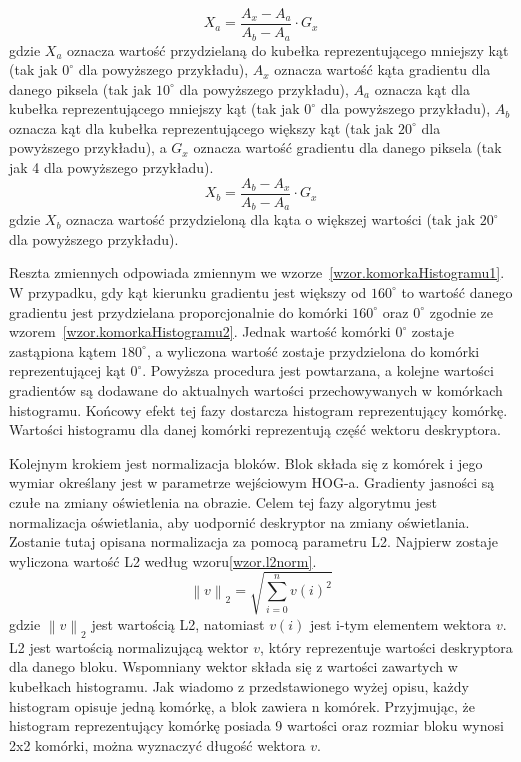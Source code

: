 \documentclass[a4paper,twoside,12pt]{book}
\begin{document}
    \large
    \begin{equation}
        X_{a} = \frac{A_{x}-A_{a}}{A_{b}-A_{a}} \cdot G_{x}
        \label{wzor.komorkaHistogramu1}
    \end{equation}
    \normalsize
    gdzie $X_{a}$ oznacza wartość przydzielaną do kubełka reprezentującego mniejszy kąt (tak jak $0^{\circ}$
    dla powyższego przykładu), $A_{x}$ oznacza wartość kąta gradientu dla danego piksela (tak jak $10^{\circ}$
    dla powyższego przykładu), $A_{a}$ oznacza kąt dla kubełka reprezentującego mniejszy kąt (tak jak $0^{\circ}$
    dla powyższego przykładu), $A_{b}$ oznacza kąt dla kubełka reprezentującego większy kąt (tak jak $20^{\circ}$
    dla powyższego przykładu), a $G_{x}$ oznacza wartość gradientu dla danego piksela (tak jak 4 dla powyższego
    przykładu).
    \large
    \begin{equation}
        X_{b} = \frac{A_{b}-A_{x}}{A_{b}-A_{a}} \cdot G_{x}
        \label{wzor.komorkaHistogramu2}
    \end{equation}
    \normalsize
    gdzie $X_{b}$ oznacza wartość przydzieloną dla kąta o większej wartości (tak jak $20^{\circ}$
    dla powyższego przykładu).

    Reszta zmiennych odpowiada zmiennym we wzorze~\ref{wzor.komorkaHistogramu1}.
    W przypadku, gdy kąt kierunku gradientu jest większy od $160^{\circ}$ to wartość danego gradientu jest
    przydzielana proporcjonalnie do komórki $160^{\circ}$ oraz $0^{\circ}$ zgodnie ze
    wzorem~\ref{wzor.komorkaHistogramu2}. Jednak wartość komórki $0^{\circ}$ zostaje zastąpiona kątem $180^{\circ}$,
    a wyliczona wartość zostaje przydzielona do komórki reprezentującej kąt $0^{\circ}$.
    Powyższa procedura jest powtarzana, a kolejne wartości gradientów są dodawane do aktualnych wartości przechowywanych
    w komórkach histogramu. Końcowy efekt tej fazy dostarcza histogram reprezentujący komórkę. Wartości histogramu
    dla danej komórki reprezentują część wektoru deskryptora.

    Kolejnym krokiem jest normalizacja bloków. Blok składa się z komórek i jego wymiar określany jest w parametrze
    wejściowym HOG-a.
    Gradienty jasności są czułe na zmiany oświetlenia na obrazie. Celem tej fazy algorytmu jest normalizacja oświetlania,
    aby uodpornić deskryptor na zmiany oświetlania.
    Zostanie tutaj opisana normalizacja za pomocą parametru L2.
    Najpierw zostaje wyliczona wartość L2 według wzoru\ref{wzor.l2norm}.
    \large
    \begin{equation}
        \left \|v  \right \|_{2}=\sqrt{\sum_{i=0}^{n}v(i)^{2}}
        \label{wzor.l2norm}
    \end{equation}
    \normalsize
    gdzie $\left \|v  \right \|_{2}$ jest wartością L2, natomiast $v(i)$ jest i-tym elementem wektora $v$.
    L2 jest wartością normalizującą wektor $v$, który reprezentuje
    wartości
    deskryptora dla danego bloku. Wspomniany wektor składa się z wartości zawartych w kubełkach histogramu. Jak
    wiadomo z
    przedstawionego wyżej opisu, każdy histogram opisuje jedną komórkę, a blok zawiera n komórek.
    Przyjmując, że histogram reprezentujący komórkę posiada 9 wartości oraz rozmiar bloku
    wynosi 2x2 komórki, można wyznaczyć długość wektora $v$.
\end{document}
